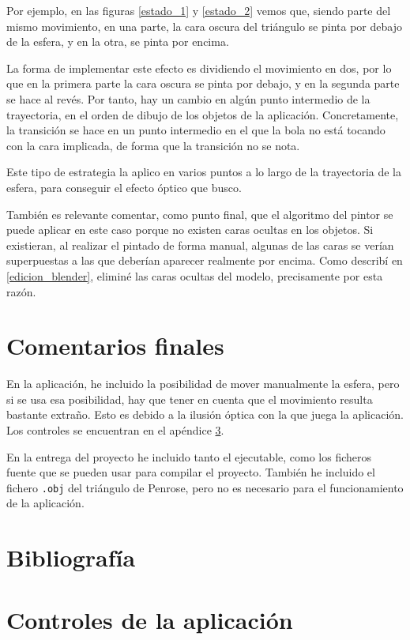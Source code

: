\documentclass[a4paper,12pt]{article}
\begin{document}
Por ejemplo, en las figuras \ref{estado_1} y \ref{estado_2} vemos que, siendo parte del mismo movimiento, en una parte, la cara oscura del triángulo se pinta por debajo de la esfera, y en la otra, se pinta por encima.

La forma de implementar este efecto es dividiendo el movimiento en dos, por lo que en la primera parte la cara oscura se pinta por debajo, y en la segunda parte se hace al revés. Por tanto, hay un cambio en algún punto intermedio de la trayectoria, en el orden de dibujo de los objetos de la aplicación. Concretamente, la transición se hace en un punto intermedio en el que la bola no está tocando con la cara implicada, de forma que la transición no se nota.

Este tipo de estrategia la aplico en varios puntos a lo largo de la trayectoria de la esfera, para conseguir el efecto óptico que busco.

También es relevante comentar, como punto final, que el algoritmo del pintor se puede aplicar en este caso porque no existen caras ocultas en los objetos. Si existieran, al realizar el pintado de forma manual, algunas de las caras se verían superpuestas a las que deberían aparecer realmente por encima. Como describí en \ref{edicion_blender}, eliminé las caras ocultas del modelo, precisamente por esta razón.

\section{Comentarios finales}

En la aplicación, he incluido la posibilidad de mover manualmente la esfera, pero si se usa esa posibilidad, hay que tener en cuenta que el movimiento resulta bastante extraño. Esto es debido a la ilusión óptica con la que juega la aplicación. Los controles se encuentran en el apéndice \ref{controles}.

En la entrega del proyecto he incluido tanto el ejecutable, como los ficheros fuente que se pueden usar para compilar el proyecto. También he incluido el fichero \texttt{.obj} del triángulo de Penrose, pero no es necesario para el funcionamiento de la aplicación.

\newpage
\section{Bibliografía}


\newpage
\appendix
\section{Controles de la aplicación} \label{controles}
\end{document}
